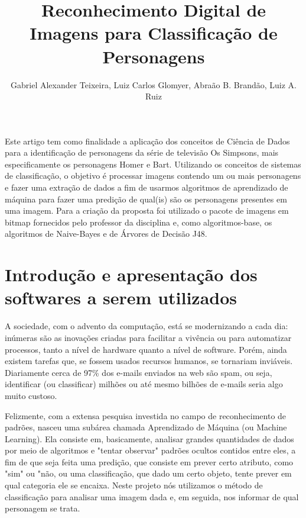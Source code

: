 \documentclass[12pt]{article}
\title{Reconhecimento Digital de Imagens para Classificação de Personagens}
\author{Gabriel Alexander Teixeira, Luiz Carlos Glomyer, Abraão B. Brandão, Luiz A. Ruiz}
\begin{document}
 

\maketitle %

\begin{resumo} 
  Este artigo tem como finalidade a aplicação dos conceitos de Ciência de Dados para a identificação de personagens da série de televisão Os Simpsons, mais especificamente os personagens Homer e Bart. Utilizando os conceitos de sistemas de classificação, o objetivo é processar imagens contendo um ou mais personagens e fazer uma extração de dados a fim de usarmos algoritmos de aprendizado de máquina para fazer uma predição de qual(is) são os personagens presentes em uma imagem. Para a criação da proposta foi utilizado o pacote de imagens em bitmap fornecidos pelo professor da disciplina e, como algoritmos-base, os algoritmos de Naive-Bayes e de Árvores de Decisão J48.
\end{resumo}
\section{Introdução e apresentação dos softwares a serem utilizados}

A sociedade, com o advento da computação, está se modernizando a cada dia: inúmeras são as inovações criadas para facilitar a vivência ou para automatizar processos, tanto a nível de hardware quanto a nível de software. Porém, ainda existem tarefas que, se fossem usados recursos humanos, se tornariam inviáveis. Diariamente cerca de 97\% dos e-mails enviados na web são spam\cite{SPAM:17}, ou seja, identificar (ou classificar) milhões ou até mesmo bilhões de e-mails seria algo muito custoso. 

Felizmente, com a extensa pesquisa investida no campo de reconhecimento de padrões, nasceu uma subárea chamada Aprendizado de Máquina (ou Machine Learning). Ela consiste em, basicamente, analisar grandes quantidades de dados por meio de algoritmos e "tentar observar" padrões ocultos contidos entre eles, a fim de que seja feita uma predição, que consiste em prever certo atributo, como "sim" ou "não, ou uma classificação, que dado um certo objeto, tente prever em qual categoria ele se encaixa. Neste projeto nós utilizamos o método de classificação para analisar uma imagem dada e, em seguida, nos informar de qual personagem se trata.
\end{document}
